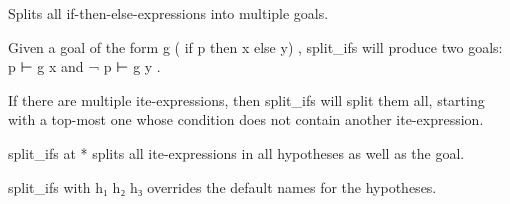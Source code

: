 \documentclass{article}
\begin{document}
\par
Splits all if-then-else-expressions into multiple goals.
\par
Given a goal of the form 
\colorbox[RGB]{253,246,227}{{{{\color[RGB]{101, 123, 131} g ( }}}{{{\color[RGB]{133, 153, 0} if }}}{{{\color[RGB]{101, 123, 131}  p  }}}{{{\color[RGB]{133, 153, 0} then }}}{{{\color[RGB]{101, 123, 131}  x  }}}{{{\color[RGB]{133, 153, 0} else }}}{{{\color[RGB]{101, 123, 131}  y) }}}}, 
\colorbox[RGB]{253,246,227}{{{{\color[RGB]{101, 123, 131} split\_ifs }}}} will produce
two goals: 
\colorbox[RGB]{253,246,227}{{{{\color[RGB]{101, 123, 131} p ⊢ g x }}}} and 
\colorbox[RGB]{253,246,227}{{{{\color[RGB]{181, 137, 0} ¬ }}}{{{\color[RGB]{101, 123, 131} p ⊢ g y }}}}.
\par
If there are multiple ite-expressions, then 
\colorbox[RGB]{253,246,227}{{{{\color[RGB]{101, 123, 131} split\_ifs }}}} will split them all,
starting with a top-most one whose condition does not contain another
ite-expression.
\par
\colorbox[RGB]{253,246,227}{{{{\color[RGB]{101, 123, 131} split\_ifs  }}}{{{\color[RGB]{133, 153, 0} at }}}{{{\color[RGB]{101, 123, 131}   }}}{{{\color[RGB]{181, 137, 0} * }}}} splits all ite-expressions in all hypotheses as well as the goal.
\par
\colorbox[RGB]{253,246,227}{{{{\color[RGB]{101, 123, 131} split\_ifs  }}}{{{\color[RGB]{133, 153, 0} with }}}{{{\color[RGB]{101, 123, 131}  h₁ h₂ h₃ }}}} overrides the default names for the hypotheses.
\end{document}

